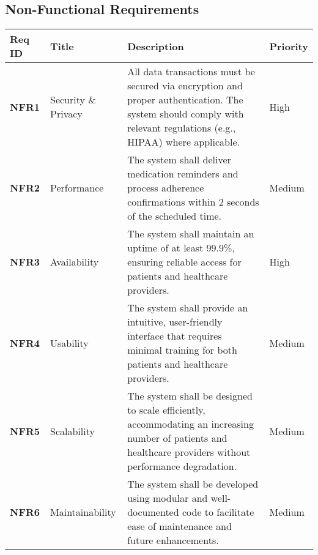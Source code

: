 \documentclass[
  12pt,
]{article}
\begin{document}
\subsection{Non-Functional
Requirements}\label{non-functional-requirements}

\begin{longtable}[]{@{}
  >{\raggedright\arraybackslash}p{}
  >{\raggedright\arraybackslash}p{}
  >{\raggedright\arraybackslash}p{}
  >{\raggedright\arraybackslash}p{}@{}}
\toprule\noalign{}
\begin{minipage}[b]{\linewidth}\raggedright
\textbf{Req ID}
\end{minipage} & \begin{minipage}[b]{\linewidth}\raggedright
\textbf{Title}
\end{minipage} & \begin{minipage}[b]{\linewidth}\raggedright
\textbf{Description}
\end{minipage} & \begin{minipage}[b]{\linewidth}\raggedright
\textbf{Priority}
\end{minipage} \\
\midrule\noalign{}
\endhead
\bottomrule\noalign{}
\endlastfoot
\textbf{NFR1} & Security \& Privacy & All data transactions must be
secured via encryption and proper authentication. The system should
comply with relevant regulations (e.g., HIPAA) where applicable. &
High \\
\textbf{NFR2} & Performance & The system shall deliver medication
reminders and process adherence confirmations within 2 seconds of the
scheduled time. & Medium \\
\textbf{NFR3} & Availability & The system shall maintain an uptime of at
least 99.9\%, ensuring reliable access for patients and healthcare
providers. & High \\
\textbf{NFR4} & Usability & The system shall provide an intuitive,
user-friendly interface that requires minimal training for both patients
and healthcare providers. & Medium \\
\textbf{NFR5} & Scalability & The system shall be designed to scale
efficiently, accommodating an increasing number of patients and
healthcare providers without performance degradation. & Medium \\
\textbf{NFR6} & Maintainability & The system shall be developed using
modular and well-documented code to facilitate ease of maintenance and
future enhancements. & Medium \\
\end{longtable}
\end{document}
